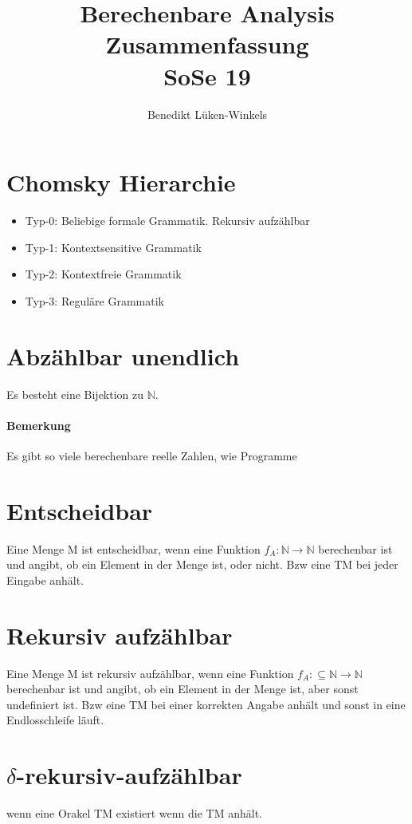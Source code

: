 \documentclass[ngerman]{scrartcl}
\title{Berechenbare Analysis \\ Zusammenfassung \\ SoSe 19}
\author{Benedikt Lüken-Winkels}
\begin{document}
\maketitle
\tableofcontents
\newpage
\section{Chomsky Hierarchie}

\begin{itemize}
  \item Typ-0: Beliebige formale Grammatik. Rekursiv aufzählbar
  \item Typ-1: Kontextsensitive Grammatik
  \item Typ-2: Kontextfreie Grammatik
  \item Typ-3: Reguläre Grammatik
\end{itemize}

\section{Abzählbar unendlich} 
Es besteht eine Bijektion zu $ \mathbb{N} $. 
\paragraph{Bemerkung} Es gibt so viele berechenbare reelle Zahlen, wie Programme

\section{Entscheidbar} 
Eine Menge M ist entscheidbar, wenn eine Funktion $ f_A : \mathbb{N} \rightarrow \mathbb{N} $ berechenbar ist und angibt, ob ein Element in der Menge ist, oder nicht. Bzw eine TM bei jeder Eingabe anhält.

\section{Rekursiv aufzählbar} 
Eine Menge M ist rekursiv aufzählbar, wenn eine Funktion $ f_A : \subseteq \mathbb{N} \rightarrow \mathbb{N} $ berechenbar ist und angibt, ob ein Element in der Menge ist, aber sonst undefiniert ist. Bzw eine TM bei einer korrekten Angabe anhält und sonst in eine Endlosschleife läuft.

\section{$ \delta $-rekursiv-aufzählbar} wenn eine Orakel TM existiert wenn die TM anhält.
\end{document}
